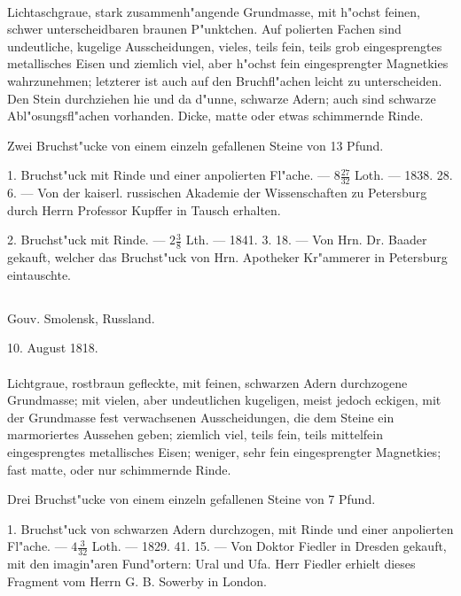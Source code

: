 \documentclass[a4paper, 11pt, oneside, polutonikogreek, german]{article}
\begin{document}
\paragraph{}
Lichtaschgraue, stark zusammenh"angende Grundmasse, mit h"ochst feinen, schwer unterscheidbaren braunen P"unktchen. Auf polierten Fachen sind undeutliche, kugelige Ausscheidungen, vieles, teils fein, teils grob eingesprengtes metallisches Eisen und ziemlich viel, aber h"ochst fein eingesprengter Magnetkies wahrzunehmen; letzterer ist auch auf den Bruchfl"achen leicht zu unterscheiden. Den Stein durchziehen hie und da d"unne, schwarze Adern; auch sind schwarze Abl"osungsfl"achen vorhanden. Dicke, matte oder etwas schimmernde Rinde.

Zwei Bruchst"ucke von einem einzeln gefallenen Steine von 13 Pfund.

1. Bruchst"uck mit Rinde und einer anpolierten Fl"ache. --- $\mathfrak{8\frac{27}{32}}$ Loth. --- 1838. 28. 6. --- Von der kaiserl. russischen Akademie der Wissenschaften zu Petersburg durch Herrn Professor Kupffer in Tausch erhalten.

2. Bruchst"uck mit Rinde. --- $\mathfrak{2\frac{3}{8}}$ Lth. --- 1841. 3. 18. --- Von Hrn. Dr. Baader gekauft, welcher das Bruchst"uck von Hrn. Apotheker Kr"ammerer in Petersburg eintauschte.
\subsection{}
\begin{center}

Gouv. Smolensk, Russland.

10. August 1818.
\end{center}
\paragraph{}
Lichtgraue, rostbraun gefleckte, mit feinen, schwarzen Adern durchzogene Grundmasse; mit vielen, aber undeutlichen kugeligen, meist jedoch eckigen, mit der Grundmasse fest verwachsenen Ausscheidungen, die dem Steine ein marmoriertes Aussehen geben; ziemlich viel, teils fein, teils mittelfein eingesprengtes metallisches Eisen; weniger, sehr fein eingesprengter Magnetkies; fast matte, oder nur schimmernde Rinde.

Drei Bruchst"ucke von einem einzeln gefallenen Steine von 7 Pfund.

1. Bruchst"uck von schwarzen Adern durchzogen, mit Rinde und einer anpolierten Fl"ache. --- $\mathfrak{4\frac{3}{32}}$ Loth. --- 1829. 41. 15. --- Von Doktor Fiedler in Dresden gekauft, mit den imagin"aren Fund"ortern: Ural und Ufa. Herr Fiedler erhielt dieses Fragment vom Herrn G. B. Sowerby in London.
\end{document}
